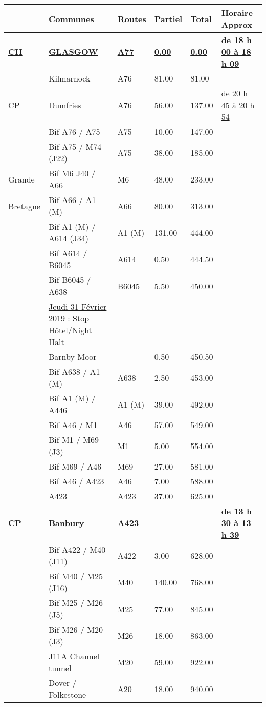 \documentclass{article}%
\begin{document}
\begin{longtable}{p{2.25cm}|p{7.0cm}|p{1.5cm}|p{1.5cm}|p{1.5cm}|p{3.5cm}}%
\hline%
&Communes&Routes&Partiel&Total&Horaire Approx\\%
\hline%
\endhead%
\endfoot%
\endlastfoot%
\textbf{\underline{﻿CH}}&\textbf{\underline{GLASGOW}}&\textbf{\underline{A77}}&\textbf{\underline{0.00}}&\textbf{\underline{0.00}}&\textbf{\underline{de 18 h 00 à 18 h 09}}\\%
 &Kilmarnock&A76&81.00&81.00& \\%
\underline{CP}&\underline{Dumfries}&\underline{A76}&\underline{56.00}&\underline{137.00}&\underline{de 20 h 45 à 20 h 54 }\\%
 &Bif A76 / A75&A75&10.00&147.00& \\%
 &Bif A75  / M74 (J22)&A75&38.00&185.00& \\%
Grande  &Bif M6 J40 / A66&M6&48.00&233.00& \\%
Bretagne&Bif A66 / A1 (M)&A66&80.00&313.00& \\%
 &Bif A1 (M) / A614 (J34)&A1 (M)&131.00&444.00& \\%
 &Bif A614 / B6045&A614&0.50&444.50& \\%
 &Bif B6045 / A638&B6045&5.50&450.00& \\%
 &\underline{Jeudi 31 Février 2019 :  Stop Hôtel/Night Halt}& & & & \\%
 &Barnby Moor & &0.50&450.50& \\%
 &Bif A638 / A1 (M)&A638&2.50&453.00& \\%
 &Bif A1 (M) / A446&A1 (M)&39.00&492.00& \\%
 &Bif A46 / M1&A46&57.00&549.00& \\%
 &Bif M1 / M69 (J3)&M1&5.00&554.00& \\%
 &Bif M69 / A46&M69&27.00&581.00& \\%
 &Bif A46 / A423&A46&7.00&588.00& \\%
 &A423&A423&37.00&625.00& \\%
\textbf{\underline{CP}}&\textbf{\underline{Banbury}}&\textbf{\underline{A423}}& & &\textbf{\underline{de 13 h 30 à 13 h 39 }}\\%
 &Bif A422 / M40 (J11)&A422&3.00&628.00& \\%
 &Bif M40 / M25 (J16)&M40&140.00&768.00& \\%
 &Bif M25 / M26 (J5) &M25&77.00&845.00& \\%
 &Bif M26 / M20 (J3)&M26&18.00&863.00& \\%
 &J11A Channel tunnel&M20&59.00&922.00& \\%
 &Dover / Folkestone               &A20&18.00&940.00& \\%
\hline%
\end{longtable}%
\begin{flushleft} \textit{} \end{flushleft}%
\end{document}
